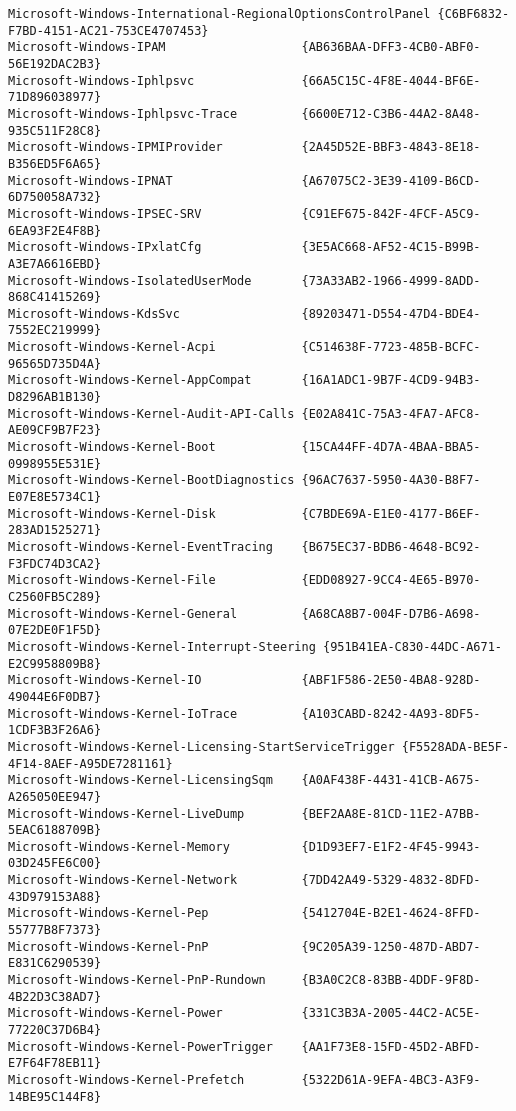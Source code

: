 \documentclass{report}
\begin{document}
\begin{lstlisting}[breaklines=true,basicstyle=\tiny]
Microsoft-Windows-International-RegionalOptionsControlPanel {C6BF6832-F7BD-4151-AC21-753CE4707453}
Microsoft-Windows-IPAM                   {AB636BAA-DFF3-4CB0-ABF0-56E192DAC2B3}
Microsoft-Windows-Iphlpsvc               {66A5C15C-4F8E-4044-BF6E-71D896038977}
Microsoft-Windows-Iphlpsvc-Trace         {6600E712-C3B6-44A2-8A48-935C511F28C8}
Microsoft-Windows-IPMIProvider           {2A45D52E-BBF3-4843-8E18-B356ED5F6A65}
Microsoft-Windows-IPNAT                  {A67075C2-3E39-4109-B6CD-6D750058A732}
Microsoft-Windows-IPSEC-SRV              {C91EF675-842F-4FCF-A5C9-6EA93F2E4F8B}
Microsoft-Windows-IPxlatCfg              {3E5AC668-AF52-4C15-B99B-A3E7A6616EBD}
Microsoft-Windows-IsolatedUserMode       {73A33AB2-1966-4999-8ADD-868C41415269}
Microsoft-Windows-KdsSvc                 {89203471-D554-47D4-BDE4-7552EC219999}
Microsoft-Windows-Kernel-Acpi            {C514638F-7723-485B-BCFC-96565D735D4A}
Microsoft-Windows-Kernel-AppCompat       {16A1ADC1-9B7F-4CD9-94B3-D8296AB1B130}
Microsoft-Windows-Kernel-Audit-API-Calls {E02A841C-75A3-4FA7-AFC8-AE09CF9B7F23}
Microsoft-Windows-Kernel-Boot            {15CA44FF-4D7A-4BAA-BBA5-0998955E531E}
Microsoft-Windows-Kernel-BootDiagnostics {96AC7637-5950-4A30-B8F7-E07E8E5734C1}
Microsoft-Windows-Kernel-Disk            {C7BDE69A-E1E0-4177-B6EF-283AD1525271}
Microsoft-Windows-Kernel-EventTracing    {B675EC37-BDB6-4648-BC92-F3FDC74D3CA2}
Microsoft-Windows-Kernel-File            {EDD08927-9CC4-4E65-B970-C2560FB5C289}
Microsoft-Windows-Kernel-General         {A68CA8B7-004F-D7B6-A698-07E2DE0F1F5D}
Microsoft-Windows-Kernel-Interrupt-Steering {951B41EA-C830-44DC-A671-E2C9958809B8}
Microsoft-Windows-Kernel-IO              {ABF1F586-2E50-4BA8-928D-49044E6F0DB7}
Microsoft-Windows-Kernel-IoTrace         {A103CABD-8242-4A93-8DF5-1CDF3B3F26A6}
Microsoft-Windows-Kernel-Licensing-StartServiceTrigger {F5528ADA-BE5F-4F14-8AEF-A95DE7281161}
Microsoft-Windows-Kernel-LicensingSqm    {A0AF438F-4431-41CB-A675-A265050EE947}
Microsoft-Windows-Kernel-LiveDump        {BEF2AA8E-81CD-11E2-A7BB-5EAC6188709B}
Microsoft-Windows-Kernel-Memory          {D1D93EF7-E1F2-4F45-9943-03D245FE6C00}
Microsoft-Windows-Kernel-Network         {7DD42A49-5329-4832-8DFD-43D979153A88}
Microsoft-Windows-Kernel-Pep             {5412704E-B2E1-4624-8FFD-55777B8F7373}
Microsoft-Windows-Kernel-PnP             {9C205A39-1250-487D-ABD7-E831C6290539}
Microsoft-Windows-Kernel-PnP-Rundown     {B3A0C2C8-83BB-4DDF-9F8D-4B22D3C38AD7}
Microsoft-Windows-Kernel-Power           {331C3B3A-2005-44C2-AC5E-77220C37D6B4}
Microsoft-Windows-Kernel-PowerTrigger    {AA1F73E8-15FD-45D2-ABFD-E7F64F78EB11}
Microsoft-Windows-Kernel-Prefetch        {5322D61A-9EFA-4BC3-A3F9-14BE95C144F8}

\end{lstlisting}
\end{document}

